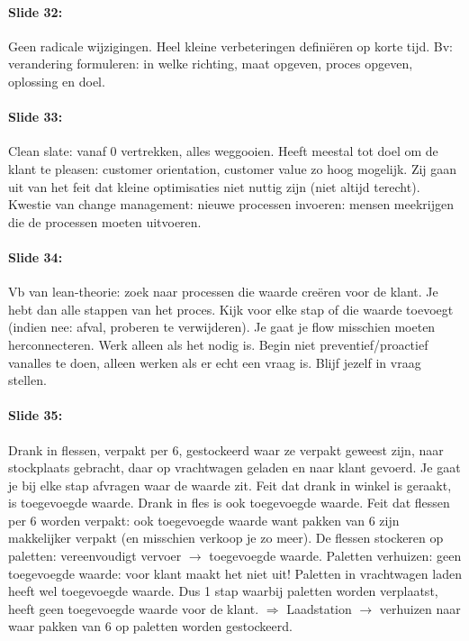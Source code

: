 \documentclass[10pt,a4paper]{report}
\begin{document}
\paragraph{Slide 32:}Geen radicale wijzigingen. Heel kleine verbeteringen definiëren op korte tijd.
Bv: verandering formuleren: in welke richting, maat opgeven, proces opgeven, oplossing en doel.

\paragraph{Slide 33:}Clean slate: vanaf 0 vertrekken, alles weggooien. Heeft meestal tot doel om de klant te pleasen: customer orientation, customer value zo hoog mogelijk. Zij gaan uit van het feit dat kleine optimisaties niet nuttig zijn (niet altijd terecht). Kwestie van change management: nieuwe processen invoeren: mensen meekrijgen die de processen moeten uitvoeren.

\paragraph{Slide 34:}Vb van lean-theorie: zoek naar processen die waarde creëren voor de klant. Je hebt dan alle stappen van het proces. Kijk voor elke stap of die waarde toevoegt (indien nee: afval, proberen te verwijderen). Je gaat je flow misschien moeten herconnecteren. Werk alleen als het nodig is. Begin niet preventief/proactief vanalles te doen, alleen werken als er echt een vraag is. Blijf jezelf in vraag stellen.

\paragraph{Slide 35:}Drank in flessen, verpakt per 6, gestockeerd waar ze verpakt geweest zijn, naar stockplaats gebracht, daar op vrachtwagen geladen en naar klant gevoerd. Je gaat je bij elke stap afvragen waar de waarde zit. Feit dat drank in winkel is geraakt, is toegevoegde waarde. Drank in fles is ook toegevoegde waarde. Feit dat flessen per 6 worden verpakt: ook toegevoegde waarde want pakken van 6 zijn makkelijker verpakt (en misschien verkoop je zo meer).  De flessen stockeren op paletten: vereenvoudigt vervoer $\rightarrow$ toegevoegde waarde. Paletten verhuizen: geen toegevoegde waarde: voor klant maakt het niet uit! Paletten in vrachtwagen laden heeft wel toegevoegde waarde.
Dus 1 stap waarbij paletten worden verplaatst, heeft geen toegevoegde waarde voor de klant. $\Rightarrow$ Laadstation $\rightarrow$ verhuizen naar waar pakken van 6 op paletten worden gestockeerd.
\end{document}

